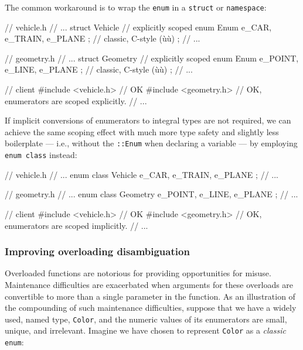 \noindent The common workaround is to wrap the \texttt{enum} in a \texttt{struct}
or \texttt{namespace}:

\begin{emcppslisting}
// vehicle.h
// ...
struct Vehicle {                            // explicitly scoped
    enum Enum { e_CAR, e_TRAIN, e_PLANE };  // classic, C-style (ù{}ù)
};
// ...

// geometry.h
// ...
struct Geometry {                            // explicitly scoped
    enum Enum { e_POINT, e_LINE, e_PLANE };  // classic, C-style (ù{}ù)
};
// ...

// client
#include <vehicle.h>    // OK
#include <geometry.h>   // OK, enumerators are scoped explicitly.
// ...
\end{emcppslisting}

\noindent If implicit conversions of enumerators to integral types are not
required, we can achieve the same scoping effect with much more type
safety and slightly less boilerplate --- i.e., without the
\texttt{::Enum} when declaring a variable --- by employing
\texttt{enum}~\texttt{class} instead:

\begin{emcppslisting}
// vehicle.h
// ...
enum class Vehicle { e_CAR, e_TRAIN, e_PLANE };
// ...

// geometry.h
// ...
enum class Geometry { e_POINT, e_LINE, e_PLANE };
// ...

// client
#include <vehicle.h>  // OK
#include <geometry.h>   // OK, enumerators are scoped implicitly.
// ...
\end{emcppslisting}

\subsubsection[Improving overloading disambiguation]{Improving overloading disambiguation}\label{improving-overloading-disambiguation}

Overloaded functions are notorious for providing opportunities for
misuse. Maintenance difficulties are exacerbated when arguments for
these overloads are convertible to more than a single parameter in the
function. As an illustration of the compounding of such maintenance
difficulties, suppose that we have a widely used, named type,
\texttt{Color}, and the numeric values of its enumerators are small,
unique, and irrelevant. Imagine we have chosen to represent
\texttt{Color} as a \emph{classic} \texttt{enum}:

